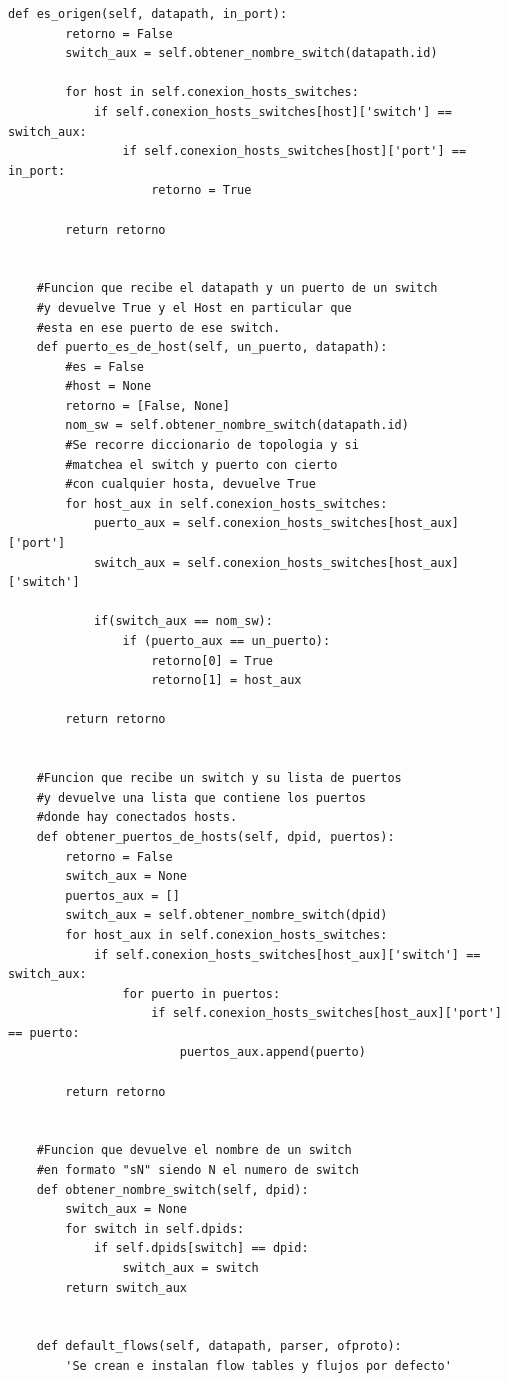 \documentclass[12pt,a4paper,oneside]{book}
\begin{document}
\begin{lstlisting}[style=codigobase,  label = cod_correrP, caption= controlador.py]
    def es_origen(self, datapath, in_port):
        retorno = False
        switch_aux = self.obtener_nombre_switch(datapath.id)

        for host in self.conexion_hosts_switches:
            if self.conexion_hosts_switches[host]['switch'] == switch_aux:
                if self.conexion_hosts_switches[host]['port'] == in_port:
                    retorno = True

        return retorno


    #Funcion que recibe el datapath y un puerto de un switch
    #y devuelve True y el Host en particular que
    #esta en ese puerto de ese switch.
    def puerto_es_de_host(self, un_puerto, datapath):
        #es = False
        #host = None
        retorno = [False, None]
        nom_sw = self.obtener_nombre_switch(datapath.id)
        #Se recorre diccionario de topologia y si
        #matchea el switch y puerto con cierto
        #con cualquier hosta, devuelve True
        for host_aux in self.conexion_hosts_switches:
            puerto_aux = self.conexion_hosts_switches[host_aux]['port']
            switch_aux = self.conexion_hosts_switches[host_aux]['switch']

            if(switch_aux == nom_sw):
                if (puerto_aux == un_puerto):
                    retorno[0] = True
                    retorno[1] = host_aux

        return retorno


    #Funcion que recibe un switch y su lista de puertos
    #y devuelve una lista que contiene los puertos
    #donde hay conectados hosts.
    def obtener_puertos_de_hosts(self, dpid, puertos):
        retorno = False
        switch_aux = None
        puertos_aux = []
        switch_aux = self.obtener_nombre_switch(dpid)
        for host_aux in self.conexion_hosts_switches:
            if self.conexion_hosts_switches[host_aux]['switch'] == switch_aux:
                for puerto in puertos:
                    if self.conexion_hosts_switches[host_aux]['port'] == puerto:
                        puertos_aux.append(puerto)

        return retorno


    #Funcion que devuelve el nombre de un switch
    #en formato "sN" siendo N el numero de switch
    def obtener_nombre_switch(self, dpid):
        switch_aux = None
        for switch in self.dpids:
            if self.dpids[switch] == dpid:
                switch_aux = switch
        return switch_aux


    def default_flows(self, datapath, parser, ofproto):
        'Se crean e instalan flow tables y flujos por defecto'


\end{lstlisting}
\end{document}

